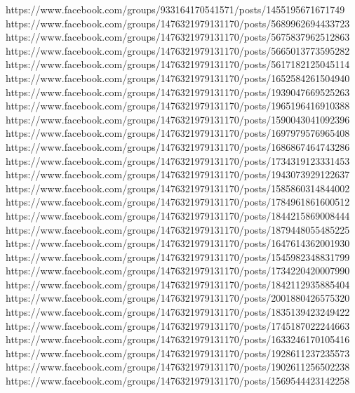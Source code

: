  
 
 
 
 


https://www.facebook.com/groups/933164170541571/posts/1455195671671749
https://www.facebook.com/groups/1476321979131170/posts/5689962694433723
https://www.facebook.com/groups/1476321979131170/posts/5675837962512863
https://www.facebook.com/groups/1476321979131170/posts/5665013773595282
https://www.facebook.com/groups/1476321979131170/posts/5617182125045114
https://www.facebook.com/groups/1476321979131170/posts/1652584261504940
https://www.facebook.com/groups/1476321979131170/posts/1939047669525263
https://www.facebook.com/groups/1476321979131170/posts/1965196416910388
https://www.facebook.com/groups/1476321979131170/posts/1590043041092396
https://www.facebook.com/groups/1476321979131170/posts/1697979576965408
https://www.facebook.com/groups/1476321979131170/posts/1686867464743286
https://www.facebook.com/groups/1476321979131170/posts/1734319123331453
https://www.facebook.com/groups/1476321979131170/posts/1943073929122637
https://www.facebook.com/groups/1476321979131170/posts/1585860314844002
https://www.facebook.com/groups/1476321979131170/posts/1784961861600512
https://www.facebook.com/groups/1476321979131170/posts/1844215869008444
https://www.facebook.com/groups/1476321979131170/posts/1879448055485225
https://www.facebook.com/groups/1476321979131170/posts/1647614362001930
https://www.facebook.com/groups/1476321979131170/posts/1545982348831799
https://www.facebook.com/groups/1476321979131170/posts/1734220420007990
https://www.facebook.com/groups/1476321979131170/posts/1842112935885404
https://www.facebook.com/groups/1476321979131170/posts/2001880426575320
https://www.facebook.com/groups/1476321979131170/posts/1835139423249422
https://www.facebook.com/groups/1476321979131170/posts/1745187022244663
https://www.facebook.com/groups/1476321979131170/posts/1633246170105416
https://www.facebook.com/groups/1476321979131170/posts/1928611237235573
https://www.facebook.com/groups/1476321979131170/posts/1902611256502238
https://www.facebook.com/groups/1476321979131170/posts/1569544423142258
